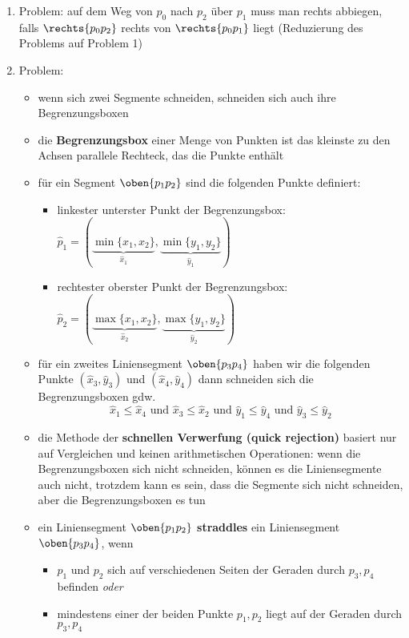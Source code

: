 \topbreak
\up\up
\begin{enumerate}
\setcounter{enumi}{\value{temp}}
	\item Problem: auf dem Weg von $p_0$ nach $p_2$ über $p_1$ muss man rechts abbiegen, falls $\rechts{p_0p_2}$ rechts von $\rechts{p_0p_1}$ liegt (Reduzierung des Problems auf Problem 1)
	\item Problem:
		\begin{itemize}
			\item wenn sich zwei Segmente schneiden, schneiden sich auch ihre Begrenzungsboxen
			\item die \textbf{Begrenzungsbox} einer Menge von Punkten ist das kleinste zu den Achsen parallele Rechteck, das die Punkte enthält
			\item für ein Segment $\oben{p_1p_2}$ sind die folgenden Punkte definiert:
				\begin{itemize}
					\item linkester unterster Punkt der Begrenzungsbox:  $\hat{p}_1 =( \underbrace{\min\{x_1,x_2\}}_{\hat{x}_1},\underbrace{\min\{y_1,y_2\}}_{\hat{y}_1})$
					\item rechtester oberster Punkt der Begrenzungsbox: 
					$\hat{p}_2 =( \underbrace{\max\{x_1,x_2\}}_{\hat{x}_2},\underbrace{\max\{y_1,y_2\}}_{\hat{y}_2})$
				\end{itemize}
			\item für ein zweites Liniensegment $\oben{p_3p_4}$ haben wir die folgenden Punkte $(\hat{x}_3,\hat{y}_3)$ und $(\hat{x}_4,\hat{y}_4)$ dann schneiden sich die Begrenzungsboxen gdw.\vspace*{-0.5\baselineskip}
				\[\hat{x}_1 \leq \hat{x}_4 \text{ und } \hat{x}_3 \leq \hat{x}_2 \text{ und } \hat{y}_1\leq \hat{y}_4\text{ und } \hat{y}_3\leq \hat{y}_2\]
			\item die Methode der \textbf{schnellen Verwerfung (quick rejection)} basiert nur auf Vergleichen und keinen arithmetischen Operationen: wenn die Begrenzungsboxen sich nicht schneiden, können es die Liniensegmente auch nicht, trotzdem kann es sein, dass die Segmente sich nicht schneiden, aber die Begrenzungsboxen es tun
			\item ein Liniensegment $\oben{p_1p_2}$ \textbf{straddles} ein Liniensegment $\oben{p_3p_4}$, wenn
				\begin{itemize}
					\item $p_1$ und $p_2$ sich auf verschiedenen Seiten der Geraden durch $p_3,p_4$ befinden \textit{oder}
					\item mindestens einer der beiden Punkte $p_1,p_2$ liegt auf der Geraden durch $p_3,p_4$

\end{itemize}
\end{itemize}
\end{enumerate}
